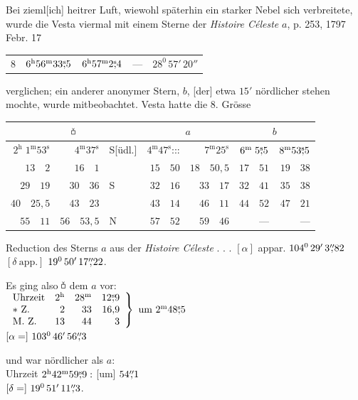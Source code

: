 Bei zieml[ich] heitrer Luft, wiewohl späterhin ein starker Nebel sich verbreitete, wurde die Vesta viermal mit einem Sterne der \textit{Histoire Céleste} $a$, p. 253, 1797 Febr. 17
\begin{center}\begin{tabular}{c|c|c|c|c}
8&$6^{\mathrm h}56^{\mathrm m}33\mathord{\overset{\mathrm{s}}{,}}5$&$6^{\mathrm h}57^{\mathrm m}2\mathord{\overset{\mathrm{s}}{,}}4$&—&$28^0\,57'\,20''$
\end{tabular}\end{center}
\noindent verglichen; ein anderer anonymer Stern, $b$, [der] etwa $15'$ nördlicher stehen mochte, wurde mitbeobachtet. Vesta hatte die 8. Grösse
\begin{center}\small\setlength{\tabcolsep}{3pt}\renewcommand{\arraystretch}{1.2}
\begin{tabular}{r r l|r r|r r}
\multicolumn{3}{c}{$\ObsVesta$}&\multicolumn{2}{c}{$a$}&\multicolumn{2}{c}{$b$}\\\hline
$2^{\mathrm h}\;1^{\mathrm m}53^{\mathrm s}$&$4^{\mathrm m}37^{\mathrm s}$&S[üdl.]&$4^{\mathrm m}47^{\mathrm s}\mathord{:}\mathord{:}\mathord{:}$&$7^{\mathrm m}25^{\mathrm s}$&$6^{\mathrm m}\;5\mathord{\overset{\mathrm{s}}{,}}5$&$8^{\mathrm m}53\mathord{\overset{\mathrm{s}}{,}}5$\\
$13\quad2$&$16\quad1$&&$15\quad50$&$18\quad50{,}5$&$17\quad51$&$19\quad38$\\
$29\quad19$&$30\quad36$&S&$32\quad16$&$33\quad17$&$32\quad41$&$35\quad38$\\
$40\quad25{,}5$&$43\quad23$&&$43\quad14$&$46\quad11$&$44\quad52$&$47\quad21$\\
$55\quad11$&$56\quad53{,}5$&N&$57\quad52$&$59\quad46$&—&—
\end{tabular}
\end{center}
\noindent Reduction des Sterns $a$ aus der \textit{Histoire Céleste} . . . $[\alpha]$ appar. $104^0\,29'\,3\mathord{\overset{\prime\prime}{,}}82$ $[\delta\ \text{app.}]$ $19^0\,50'\,17\mathord{\overset{\prime\prime}{,}}22$.
\begin{center}\small
\begin{minipage}[t]{.49\linewidth}\centering
Es ging also $\ObsVesta$ dem $a$ vor:\\[.4em]
$\left.\begin{array}{lrrr}
\text{Uhrzeit}&2^{\mathrm h}&28^{\mathrm m}&12\mathord{\overset{\mathrm{s}}{,}}9\\
\ast\ \mathrm Z.&2&33&16{,}9\\
\mathrm{M.\ Z.}&13&44&3
\end{array}\right\}\ \text{um}\ 2^{\mathrm m}48\mathord{\overset{\mathrm{s}}{,}}5$\\[.5em]
$[\alpha=]\ 103^0\,46'\,\ObsArc{56}3$
\end{minipage}\hfill
\begin{minipage}[t]{.49\linewidth}\centering
und war nördlicher als $a$:\\[.4em]
Uhrzeit $2^{\mathrm h}42^{\mathrm m}59\mathord{\overset{\mathrm{s}}{,}}9:$ [um] $54\mathord{\overset{\prime\prime}{,}}1$\\[3.3em]
$[\delta=]\ 19^0\,51'\,\ObsArc{11}3$.
\end{minipage}
\end{center}
